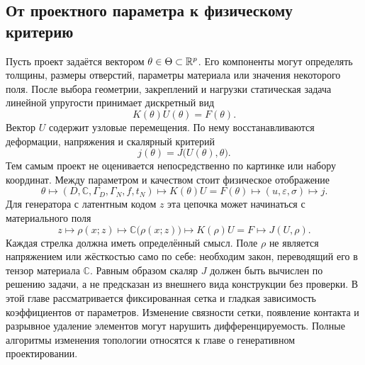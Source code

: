 \subsection{От проектного параметра к физическому критерию}
Пусть проект задаётся вектором $\theta\in\Theta\subset\mathbb{R}^p$. Его компоненты могут определять толщины, размеры отверстий, параметры материала или значения некоторого поля. После выбора геометрии, закреплений и нагрузки статическая задача линейной упругости принимает дискретный вид
\begin{equation}
\label{eq:parametric-elastic-system-v06}
 K(\theta)U(\theta)=F(\theta).
\end{equation}
Вектор $U$ содержит узловые перемещения. По нему восстанавливаются деформации, напряжения и скалярный критерий
\begin{equation}
\label{eq:parametric-elastic-objective-v06}
 j(\theta)=J\bigl(U(\theta),\theta\bigr).
\end{equation}
Тем самым проект не оценивается непосредственно по картинке или набору координат. Между параметром и качеством стоит физическое отображение
\begin{equation}
\label{eq:elastic-design-chain-v06}
 \theta
 \longmapsto
 (D,\mathbb C,\Gamma_D,\Gamma_N,f,t_N)
 \longmapsto
 K(\theta)U=F(\theta)
 \longmapsto
 (u,\varepsilon,\sigma)
 \longmapsto
 j.
\end{equation}
Для генератора с латентным кодом $z$ эта цепочка может начинаться с материального поля
\begin{equation}
\label{eq:latent-to-physics-chain-v06}
 z
 \longmapsto
 \rho(x;z)
 \longmapsto
 \mathbb C\bigl(\rho(x;z)\bigr)
 \longmapsto
 K(\rho)U=F
 \longmapsto
 J(U,\rho).
\end{equation}
Каждая стрелка должна иметь определённый смысл. Поле $\rho$ не является напряжением или жёсткостью само по себе: необходим закон, переводящий его в тензор материала $\mathbb C$. Равным образом скаляр $J$ должен быть вычислен по решению задачи, а не предсказан из внешнего вида конструкции без проверки.
В этой главе рассматривается фиксированная сетка и гладкая зависимость коэффициентов от параметров. Изменение связности сетки, появление контакта и разрывное удаление элементов могут нарушить дифференцируемость. Полные алгоритмы изменения топологии относятся к главе о генеративном проектировании.
